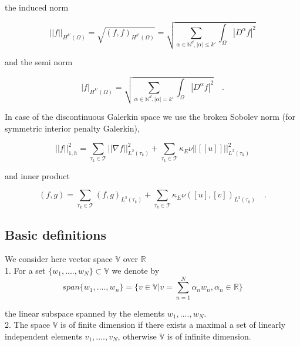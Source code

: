 \documentclass[a4paper,openany]{book}
\begin{document}
\begin{appendices}
the induced norm 

\begin{equation}
||f||_{H^{k'} (\Omega)} = \sqrt{(f,f)_{H^{k'}(\Omega)}} = \sqrt{\sum_{\alpha \in \mathbb{N}^d, |\alpha| \leq k'} \int_\Omega |D^\alpha f|^2}
\end{equation}

and the semi norm 

\begin{equation}
|f|_{H^{k'} (\Omega)} = \sqrt{\sum_{\alpha \in \mathbb{N}^d, |\alpha| = k'} \int_\Omega |D^\alpha f|^2} \quad \textrm{.}
\end{equation}

In case of the discontinuous Galerkin space we use the broken Sobolev norm (for symmetric interior penalty Galerkin), \cite{Montlaur2}

\begin{equation}
||f||_{1,h}^2 = \sum_{\tau_k \in \mathcal{T}} ||\nabla f||_{L^2(\tau_k)}^2 + \sum_{\tau_k \in \mathcal{T}} \kappa_E \nu ||[[u]]||_{L^2 (\tau_k)}^2
\end{equation}

and inner product

\begin{equation}
(f,g) = \sum_{\tau_k \in \mathcal{T}} (f,g)_{L^2(\tau_k)} + \sum_{\tau_k \in \mathcal{T}} \kappa_E \nu ([u],[v])_{L^2 (\tau_k)} \quad \textrm{.}
\end{equation}

\subsection{Basic definitions}

We consider here vector space $\mathbb{V}$ over $\mathbb{R}$\\

1. For a set $\lbrace w_1,....,w_N \rbrace \subset \mathbb{V}$ we denote by \\
\begin{equation} \label{vector space}
span \lbrace w_1,....,w_n \rbrace = \lbrace v \in \mathbb{V} | v = \sum_{n=1}^N \alpha_n w_n, \alpha_n \in \mathbb{R} \rbrace
\end{equation} 

the linear subspace spanned by the elements $w_1,....,w_N$.\\

2. The space $\mathbb{V}$ is of finite dimension if there exists a maximal a set of linearly independent elements $v_1,....,v_N$, otherwise $\mathbb{V}$ is of infinite dimension.\\


\end{appendices}
\end{document}

